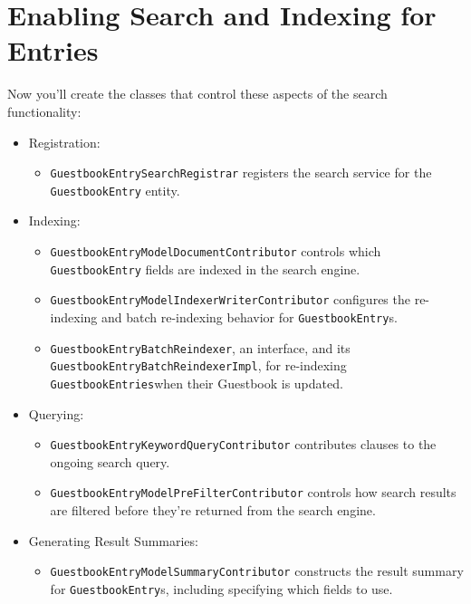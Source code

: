 \chapter{Enabling Search and Indexing for
Entries}\label{enabling-search-and-indexing-for-entries}

Now you'll create the classes that control these aspects of the search
functionality:

\begin{itemize}
\item
  Registration:

  \begin{itemize}
  \tightlist
  \item
    \texttt{GuestbookEntrySearchRegistrar} registers the search service
    for the \texttt{GuestbookEntry} entity.
  \end{itemize}
\item
  Indexing:

  \begin{itemize}
  \item
    \texttt{GuestbookEntryModelDocumentContributor} controls which
    \texttt{GuestbookEntry} fields are indexed in the search engine.
  \item
    \texttt{GuestbookEntryModelIndexerWriterContributor} configures the
    re-indexing and batch re-indexing behavior for
    \texttt{GuestbookEntry}s.
  \item
    \texttt{GuestbookEntryBatchReindexer}, an interface, and its
    \texttt{GuestbookEntryBatchReindexerImpl}, for re-indexing
    \texttt{GuestbookEntries}when their Guestbook is updated.
  \end{itemize}
\item
  Querying:

  \begin{itemize}
  \item
    \texttt{GuestbookEntryKeywordQueryContributor} contributes clauses
    to the ongoing search query.
  \item
    \texttt{GuestbookEntryModelPreFilterContributor} controls how search
    results are filtered before they're returned from the search engine.
  \end{itemize}
\item
  Generating Result Summaries:

  \begin{itemize}
  \tightlist
  \item
    \texttt{GuestbookEntryModelSummaryContributor} constructs the result
    summary for \texttt{GuestbookEntry}s, including specifying which
    fields to use.
  \end{itemize}
\end{itemize}

